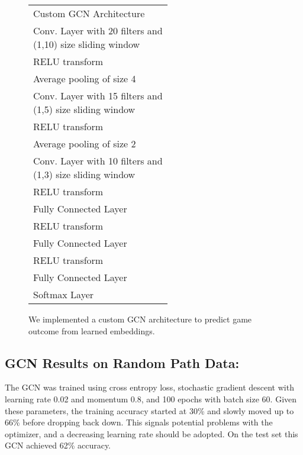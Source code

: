 \begin{figure}[h!]
  \label{fig:GCN_architecture}
  \centering
\begin{tabular}{l |}
    \rowcolor{gray!20}
    Custom GCN Architecture \\
    \rowcolor{blue!20}
    \pbox{20cm}{Conv. Layer with 20 filters and \\ (1,10) size sliding window} \\
    \rowcolor{green!20}
    RELU transform \\
    \rowcolor{blue!20}
    Average pooling of size 4 \\
    \rowcolor{green!20}
    \pbox{20cm}{Conv. Layer with 15 filters and \\ (1,5) size sliding window} \\
    \rowcolor{blue!20}
    RELU transform \\
    \rowcolor{green!20}
    Average pooling of size 2 \\
    \rowcolor{blue!20}
    \pbox{20cm}{Conv. Layer with 10 filters and \\ (1,3) size sliding window} \\
    \rowcolor{green!20}
    RELU transform \\
    \rowcolor{blue!20}
    Fully Connected Layer \\
    \rowcolor{green!20}
    RELU transform \\
    \rowcolor{blue!20}
    Fully Connected Layer \\
    \rowcolor{green!20}
    RELU transform \\
    \rowcolor{blue!20}
    Fully Connected Layer \\
    \rowcolor{green!20}
    Softmax Layer \\
\end{tabular}
\caption{We implemented a custom GCN architecture to predict game outcome from learned embeddings.}
\end{figure}

\subsection{GCN Results on Random Path Data:}

The GCN was trained using cross entropy loss, stochastic gradient descent with learning rate 0.02 and momentum 0.8, and 100 epochs with batch size 60. Given these parameters, the training accuracy started at 30\% and slowly moved up to 66\% before dropping back down. This signals potential problems with the optimizer, and a decreasing learning rate should be adopted. On the test set this GCN achieved 62\% accuracy. 

